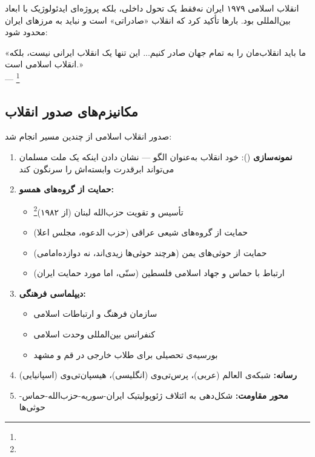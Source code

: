 انقلاب اسلامی ۱۹۷۹ ایران نه‌فقط یک تحول داخلی، بلکه پروژه‌ای ایدئولوژیک با ابعاد بین‌المللی بود.  بارها تأکید کرد که انقلاب «صادراتی» است و نباید به مرزهای ایران محدود شود:

\begin{tcolorbox}[quotebox, title={نقل‌قول تاریخی}]
«ما باید انقلاب‌مان را به تمام جهان صادر کنیم... این تنها یک انقلاب ایرانی نیست، بلکه انقلاب اسلامی است.»\\
— \footnote{}
\end{tcolorbox}

\subsection{مکانیزم‌های صدور انقلاب}
\label{subsec:ch13-export-mechanisms}

صدور انقلاب اسلامی از چندین مسیر انجام شد:

\begin{tcolorbox}[wavebox, title={مسیرهای صدور انقلاب اسلامی}]
\begin{enumerate}
\item \textbf{نمونه‌سازی} (): خود انقلاب به‌عنوان الگو — نشان دادن اینکه یک ملت مسلمان می‌تواند ابرقدرت وابسته‌اش را سرنگون کند

\item \textbf{حمایت از گروه‌های همسو:}
\begin{itemize}
\item تأسیس و تقویت حزب‌الله لبنان (از ۱۹۸۲)\footnote{}
\item حمایت از گروه‌های شیعی عراقی (حزب الدعوه، مجلس اعلا)
\item حمایت از حوثی‌های یمن (هرچند حوثی‌ها زیدی‌اند، نه دوازده‌امامی)
\item ارتباط با حماس و جهاد اسلامی فلسطین (سنّی، اما مورد حمایت ایران)
\end{itemize}

\item \textbf{دیپلماسی فرهنگی:}
\begin{itemize}
\item سازمان فرهنگ و ارتباطات اسلامی
\item کنفرانس بین‌المللی وحدت اسلامی
\item بورسیه‌ی تحصیلی برای طلاب خارجی در قم و مشهد
\end{itemize}

\item \textbf{رسانه:} شبکه‌ی العالم (عربی)، پرس‌تی‌وی (انگلیسی)، هیسپان‌تی‌وی (اسپانیایی)

\item \textbf{محور مقاومت:} شکل‌دهی به ائتلاف ژئوپولیتیک ایران-سوریه-حزب‌الله-حماس-حوثی‌ها
\end{enumerate}
\end{tcolorbox}

